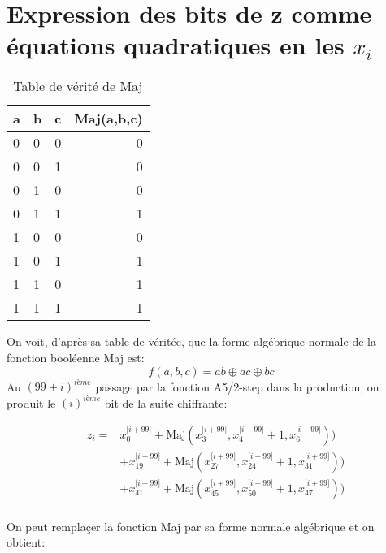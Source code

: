 \section{Expression des bits de z comme équations quadratiques en les $x_i$}
\begin{table}[h!]
\centering
\begin{tabular}{l l l|r}
a & b & c & Maj(a,b,c) \\\hline
0 & 0 & 0 & 0  \\
0 & 0 & 1 & 0 \\
0 & 1 & 0 & 0 \\
0 & 1 & 1 & 1 \\
1 & 0 & 0 & 0  \\
1 & 0 & 1 & 1 \\
1 & 1 & 0 & 1 \\
1 & 1 & 1 & 1 \\

\end{tabular}
\caption{\label{tab:widgets}Table de vérité de Maj}
\end{table}

On voit, d'après sa table de véritée, que la forme algébrique normale de la fonction booléenne Maj est:
$$f(a,b,c) = ab \oplus ac \oplus bc$$
Au $(99+i)^{ième}$ passage par la fonction A5/2-step dans la production, on produit le $(i)^{ième}$ bit de la suite chiffrante: 

\begin{equation}
\begin{aligned}
  &z_i =& x^{\lbrack i + 99\rbrack}_0 + \mbox{Maj}(x^{\lbrack i+99\rbrack}_{3}, x^{\lbrack i+99\rbrack}_{4} + 1, x^{\lbrack i+99\rbrack}_{6})) \\
  & &+ x^{\lbrack i + 99\rbrack}_{19} + \mbox{Maj}(x^{\lbrack i+99\rbrack}_{27}, x^{\lbrack i+99\rbrack}_{24} + 1, x^{\lbrack i+99\rbrack}_{31})) \\
  & &+ x^{\lbrack i + 99\rbrack}_{41} + \mbox{Maj}(x^{\lbrack i+99\rbrack}_{45}, x^{\lbrack i+99\rbrack}_{50} + 1, x^{\lbrack i+99\rbrack}_{47})) \\
\end{aligned}
\end{equation}

On peut remplaçer la fonction Maj par sa forme normale algébrique et on obtient:

